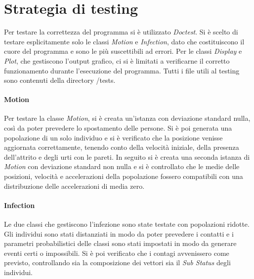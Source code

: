 \documentclass[a4paper,10pt,twocolumn]{article}
\begin{document}
\section{Strategia di testing}
Per testare la correttezza del programma si è utilizzato \emph{Doctest}. Si è scelto di testare esplicitamente solo le classi \emph{Motion} e \emph{Infection}, dato che costituiscono il cuore del programma e sono le più suscettibili ad errori. Per le classi \emph{Display} e \emph{Plot}, che gestiscono l'output grafico, ci si è limitati a verificarne il corretto funzionamento durante l'esecuzione del programma. Tutti i file utili al testing sono contenuti della directory /tests.

\paragraph{Motion}
Per testare la classe \emph{Motion}, si è creata un'istanza con deviazione standard nulla, così da poter prevedere lo spostamento delle persone. Si è poi generata una popolazione di un solo individuo e si è verificato che la posizione venisse aggiornata correttamente, tenendo conto della velocità iniziale, della presenza dell'attrito e degli urti con le pareti. In seguito si è creata una seconda istanza di \emph{Motion} con deviazione standard non nulla e si è controllato che le medie delle posizioni, velocità e accelerazioni della popolazione fossero compatibili con una distribuzione delle accelerazioni di media zero.

\paragraph{Infection}
Le due classi che gestiscono l'infezione sono state testate con popolazioni ridotte. Gli individui sono stati distanziati in modo da poter prevedere i contatti e i parametri probabilistici delle classi sono stati impostati in modo da generare eventi certi o impossibili. Si è poi verificato che i contagi avvenissero come previsto, controllando sia la composizione dei vettori sia il \emph{Sub Status} degli individui.
\end{document}
